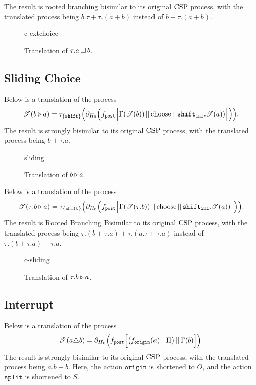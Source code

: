 \documentclass[../hons_project.tex]{subfiles}
\begin{document}
The result is rooted branching bisimilar to its original $\mathrm{CSP}$ process, with the translated process being $b.\tau + \tau.(a + b)$ instead of $b + \tau.(a + b)$.

\begin{figure}[H]
	{c-extchoice}
	\caption{Translation of $\tau.a \,\square\, b$.}
\end{figure}


\subsection{Sliding Choice}\label{ssec:diagrams-sliding}
Below is a translation of the process
\begin{equation}
	\mathscr{T}(b \triangleright a)    = \tau_{\{\mathtt{shift}\}}\Bigl(\partial_{H_{0}}\Bigl(f_{\mathtt{post}}\Bigl[ \Gamma(\mathscr{T}(b)) \,\vert\vert\, \mathrm{choose} \,\vert\vert\, \mathtt{shift}_{\mathtt{ini}} . \mathscr{T}(a)) \Bigr]\Bigr)\Bigr).
\end{equation}
The result is strongly bisimilar to its original $\mathrm{CSP}$ process, with the translated process being $b + \tau.a$.
\begin{figure}[H]
	{sliding}
	\caption{Translation of $b \triangleright a$.}
\end{figure}

Below is a translation of the process
\begin{equation}
	\mathscr{T}(\tau.b \triangleright a)= \tau_{\{\mathtt{shift}\}}\Bigl(\partial_{H_{0}}\Bigl(f_{\mathtt{post}}\Bigl[ \Gamma(\mathscr{T}(\tau.b)) \,\vert\vert\, \mathrm{choose} \,\vert\vert\, \mathtt{shift}_{\mathtt{ini}} . \mathscr{T}(a)) \Bigr]\Bigr)\Bigr).
\end{equation}
The result is Rooted Branching Bisimilar to its original $\mathrm{CSP}$ process, with the translated process being $\tau.(b+\tau.a) + \tau.(a.\tau+\tau.a)$ instead of $\tau.(b+\tau.a) + \tau.a$.

\begin{figure}[H]
	{c-sliding}
	\caption{Translation of $\tau.b \triangleright a$.}
\end{figure}


\subsection{Interrupt}\label{ssec:diagrams-interrupt}
Below is a translation of the process
\begin{equation}
	\mathscr{T}(a \triangle b) = \partial_{H_{0}}\Bigl(f_{\mathtt{post}}\Bigl[ \bigl(f_{\mathtt{origin}}(a) \,\vert\vert\, \Pi\bigr) \,\vert\vert\, \Gamma(b) \Bigr]\Bigr).
\end{equation}
The result is strongly bisimilar to its original $\mathrm{CSP}$ process, with the translated process being $a.b + b$. Here, the action $\mathtt{origin}$ is shortened to $O$, and the action $\mathtt{split}$ is shortened to $S$.
\end{document}
